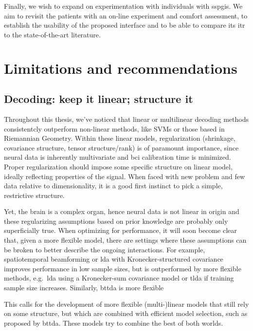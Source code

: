 Finally, we wish to expand on experimentation with individuals with
\acp{sspgi}.
We aim to revisit the patients with an on-line experiment and comfort
assessment, to establish the usability of the proposed interface and to be able
to compare its \ac{itr}  to the state-of-the-art literature.

\section{Limitations and recommendations}

\subsection{Decoding: keep it linear; structure it}

Throughout this thesis, we've noticed that linear or multilinear decoding
methods consistentcly outperform non-linear methods, like SVMs or those based
in Riemannian Geometry.
Within these linear models, regularization (shrinkage, covariance structure,
tensor structure/rank) is of paramount importance, since neural data is
inherently multivariate and \ac{bci} calibration time is minimized.
Proper regularization should impose some specific structure on linear model,
ideally reflecting properties of the signal.
When faced with new problem and few data relative to dimensionality, it is a
good first instinct to pick a simple, restrictive structure.

Yet, the brain is a complex organ, hence neural data is not linear in origin and
these regularizing assumptions based on prior knowledge are probably only
superficially true.
When optimizing for performance, it will soon become clear that, given a more
flexible model, there are
settings where these assumptions can be broken to better describe the ongoing
interactions.
For example, spatiotemporal beamforming or \ac{lda} with Kronecker-structured covariance
improves performance in low sample sizes, but is outperformed by more flexible
methods, e.g.\ \ac{lda} using a Kronecker-sum covariance model or \ac{tlda}
if training sample size increases.
Similarly, \ac{bttda} is more flexible

This calls for the development of more flexible (multi-)linear models that still rely on some
structure, but which are combined with efficient model
selection, such as proposed by \ac{bttda}.
These models try to combine the best of both worlds.

